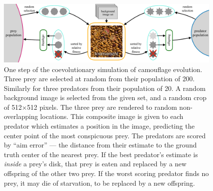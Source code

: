 \documentclass[sigconf]{acmart}
\begin{document}
\begin{figure}
    \includegraphics[width=\textwidth]{images/coc_overview.pdf}
    \caption{One step of the coevolutionary simulation of camouflage evolution. Three prey are selected at random from their population of 200. Similarly for three predators from their population of 20. A random background image is selected from the given set, and a random crop of 512×512 pixels. The three prey are rendered to random non-overlapping locations. This composite image is given to each predator which estimates a position in the image, predicting the center point of the most conspicuous prey. The predators are scored by “aim error” — the distance from their estimate to the ground truth center of the nearest prey. If the best predator's estimate is \textit{inside} a prey's disk, that prey is eaten and replaced by a new offspring of the other two prey. If the worst scoring predator finds no prey, it may die of starvation, to be replaced by a new offspring.}
    \label{fig:simulation_overview}
\end{figure}

\end{document}
